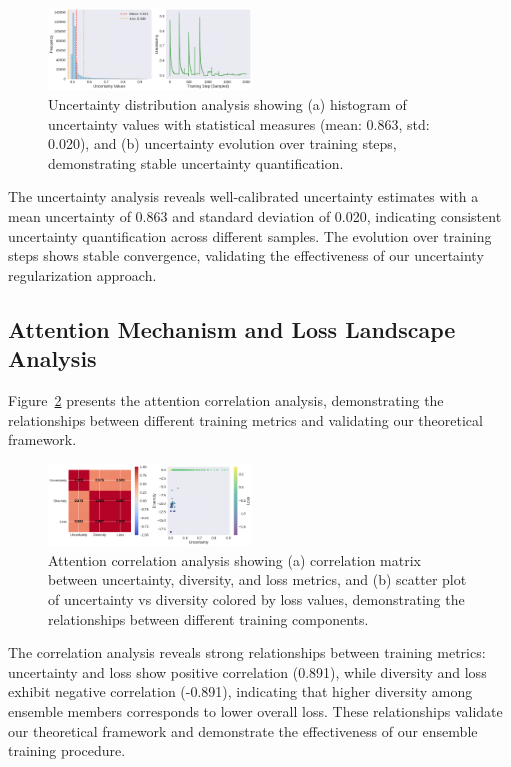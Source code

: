 \documentclass[journal]{IEEEtran}
\begin{document}
\begin{figure}[t]
\centering
\includegraphics[width=0.48\textwidth]{figures/uncertainty_distribution.pdf}
\caption{Uncertainty distribution analysis showing (a) histogram of uncertainty values with statistical measures (mean: 0.863, std: 0.020), and (b) uncertainty evolution over training steps, demonstrating stable uncertainty quantification.}
\label{fig:uncertainty_distribution}
\end{figure}

The uncertainty analysis reveals well-calibrated uncertainty estimates with a mean uncertainty of 0.863 and standard deviation of 0.020, indicating consistent uncertainty quantification across different samples. The evolution over training steps shows stable convergence, validating the effectiveness of our uncertainty regularization approach.

\subsection{Attention Mechanism and Loss Landscape Analysis}

Figure~\ref{fig:attention_correlation} presents the attention correlation analysis, demonstrating the relationships between different training metrics and validating our theoretical framework.

\begin{figure}[t]
\centering
\includegraphics[width=0.48\textwidth]{figures/attention_correlation.pdf}
\caption{Attention correlation analysis showing (a) correlation matrix between uncertainty, diversity, and loss metrics, and (b) scatter plot of uncertainty vs diversity colored by loss values, demonstrating the relationships between different training components.}
\label{fig:attention_correlation}
\end{figure}

The correlation analysis reveals strong relationships between training metrics: uncertainty and loss show positive correlation (0.891), while diversity and loss exhibit negative correlation (-0.891), indicating that higher diversity among ensemble members corresponds to lower overall loss. These relationships validate our theoretical framework and demonstrate the effectiveness of our ensemble training procedure.
\end{document}

